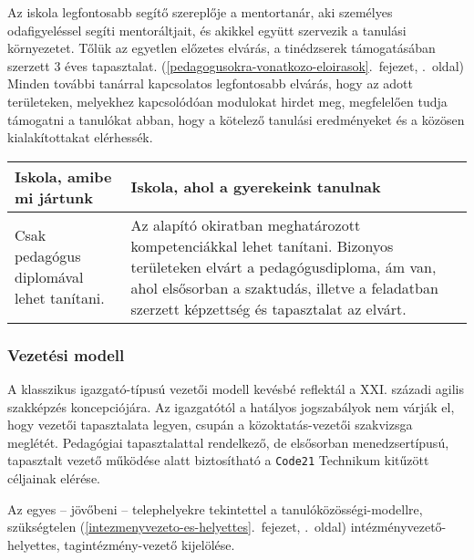 Az iskola legfontosabb segítő szereplője a mentortanár, aki személyes
odafigyeléssel segíti mentoráltjait, és akikkel együtt szervezik a
tanulási környezetet. Tőlük az egyetlen előzetes elvárás, a tinédzserek
támogatásában szerzett 3 éves tapasztalat. (\ref{pedagogusokra-vonatkozo-eloirasok}.~fejezet, \pageref{pedagogusokra-vonatkozo-eloirasok}.~oldal)
Minden további tanárral kapcsolatos legfontosabb elvárás, hogy az adott
területeken, melyekhez kapcsolódóan modulokat hirdet meg, megfelelően
tudja támogatni a tanulókat abban, hogy a kötelező tanulási eredményeket
és a közösen kialakítottakat elérhessék.

\begin{longtable}[]{@{}ll@{}}
\toprule
\begin{minipage}[b]{0.15\columnwidth}\raggedright
Iskola, amibe mi jártunk\strut
\end{minipage} & \begin{minipage}[b]{0.79\columnwidth}\raggedright
Iskola, ahol a gyerekeink tanulnak\strut
\end{minipage}\tabularnewline
\midrule
\endhead
\begin{minipage}[t]{0.15\columnwidth}\raggedright
Csak pedagógus diplomával lehet tanítani.\strut
\end{minipage} & \begin{minipage}[t]{0.79\columnwidth}\raggedright
Az alapító okiratban meghatározott kompetenciákkal lehet tanítani.
Bizonyos területeken elvárt a pedagógusdiploma, ám van, ahol elsősorban
a szaktudás, illetve a feladatban szerzett képzettség és tapasztalat az
elvárt.\strut
\end{minipage}\tabularnewline
\bottomrule
\end{longtable}

\hypertarget{vezetesi-modell}{%
\subsubsection{Vezetési modell}\label{vezetesi-modell}}

A klasszikus igazgató-típusú vezetői modell kevésbé reflektál a XXI.
századi agilis szakképzés koncepciójára. Az igazgatótól a hatályos
jogszabályok nem várják el, hogy vezetői tapasztalata legyen, csupán a
közoktatás-vezetői szakvizsga meglétét. Pedagógiai tapasztalattal
rendelkező, de elsősorban menedzsertípusú, tapasztalt vezető működése
alatt biztosítható a \texttt{Code21} Technikum kitűzött céljainak
elérése.

Az egyes -- jövőbeni -- telephelyekre tekintettel a
tanulóközösségi-modellre,
szükségtelen (\ref{intezmenyvezeto-es-helyettes}.~fejezet, \pageref{intezmenyvezeto-es-helyettes}.~oldal)
intézményvezető-helyettes, tagintézmény-vezető kijelölése.

